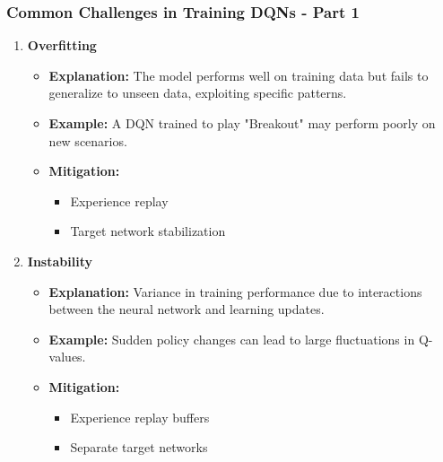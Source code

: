 \documentclass[aspectratio=169]{beamer}
\begin{document}
\begin{frame}[fragile]
    \frametitle{Common Challenges in Training DQNs - Part 1}
    
    \begin{enumerate}
        \item \textbf{Overfitting}
        \begin{itemize}
            \item \textbf{Explanation:} The model performs well on training data but fails to generalize to unseen data, exploiting specific patterns.
            \item \textbf{Example:} A DQN trained to play "Breakout" may perform poorly on new scenarios.
            \item \textbf{Mitigation:} 
                \begin{itemize}
                    \item Experience replay
                    \item Target network stabilization
                \end{itemize}
        \end{itemize}
        
        \item \textbf{Instability}
        \begin{itemize}
            \item \textbf{Explanation:} Variance in training performance due to interactions between the neural network and learning updates.
            \item \textbf{Example:} Sudden policy changes can lead to large fluctuations in Q-values.
            \item \textbf{Mitigation:} 
                \begin{itemize}
                    \item Experience replay buffers
                    \item Separate target networks
                \end{itemize}
        \end{itemize}
    \end{enumerate}
\end{frame}
\end{document}
